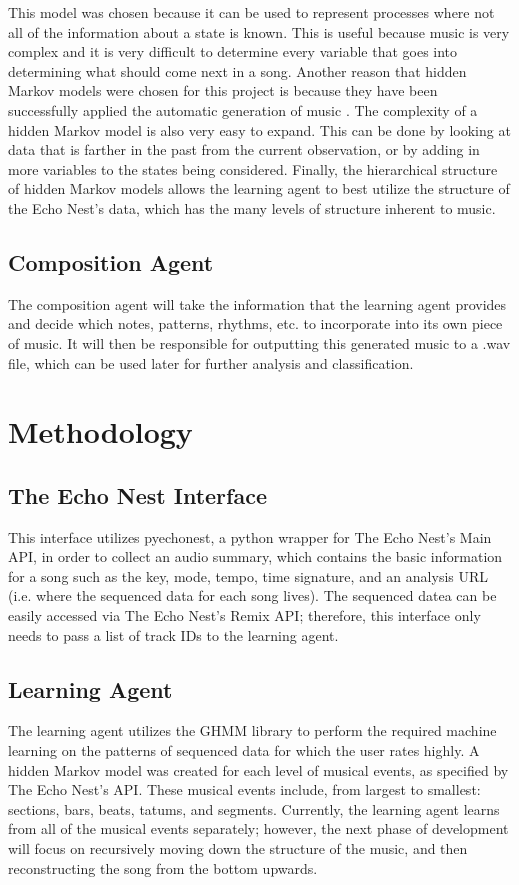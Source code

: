 \documentclass{article}
\begin{document}
This model was chosen because it can be used to represent processes where not all of the information about a state is known. This is useful because music is very complex and it is very difficult to determine every variable that goes into determining what should come next in a song. Another reason that hidden Markov models were chosen for this project is because they have been successfully applied the automatic generation of music \cite{5492670}. The complexity of a hidden Markov model is also very easy to expand. This can be done by looking at data that is farther in the past from the current observation, or by adding in more variables to the states being considered. Finally, the hierarchical structure of hidden Markov models allows the learning agent to best utilize the structure of the Echo Nest's data, which has the many levels of structure inherent to music.

\subsection{Composition Agent}
The composition agent will take the information that the learning agent provides and decide which notes, patterns, rhythms, etc. to incorporate into its own piece of music. It will then be responsible for outputting this generated music to a .wav file, which can be used later for further analysis and classification.

\section{Methodology}
\subsection{The Echo Nest Interface}
This interface utilizes pyechonest, a python wrapper for The Echo Nest's Main API, in order to collect an audio summary, which contains the basic information for a song such as the key, mode, tempo, time signature, and an analysis URL (i.e. where the sequenced data for each song lives). The sequenced datea can be easily accessed via The Echo Nest's Remix API; therefore, this interface only needs to pass a list of track IDs to the learning agent.

\subsection{Learning Agent}
The learning agent utilizes the GHMM library to perform the required machine learning on the patterns of sequenced data for which the user rates highly. A hidden Markov model was created for each level of musical events, as specified by The Echo Nest's API. These musical events include, from largest to smallest: sections, bars, beats, tatums, and segments. Currently, the learning agent learns from all of the musical events separately; however, the next phase of development will focus on recursively moving down the structure of the music, and then reconstructing the song from the bottom upwards.
\end{document}
